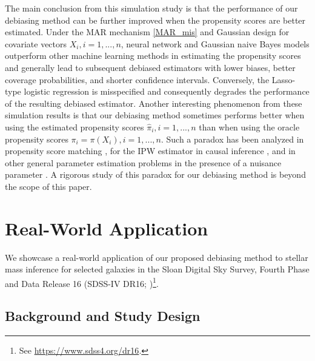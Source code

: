 \documentclass[ejsv2,noshowframe]{imsart}
\theoremstyle{plain}
\theoremstyle{definition}
\theoremstyle{remark}
\renewcommand{\hat}{\widehat}
\begin{document}
The main conclusion from this simulation study is that the performance of our debiasing method can be further improved when the propensity scores are better estimated. Under the MAR mechanism \eqref{MAR_mis} and Gaussian design for covariate vectors $X_i,i=1,...,n$, neural network and Gaussian naive Bayes models outperform other machine learning methods in estimating the propensity scores and generally lead to subsequent debiased estimators with lower biases, better coverage probabilities, and shorter confidence intervals. Conversely, the Lasso-type logistic regression is misspecified and consequently degrades the performance of the resulting debiased estimator. Another interesting phenomenon from these simulation results is that our debiasing method sometimes performs better when using the estimated propensity scores $\hat{\pi}_i,i=1,...,n$ than when using the oracle propensity scores $\pi_i=\pi(X_i),i=1,...,n$. Such a paradox has been analyzed in propensity score matching \citep{rosenbaum1987model}, for the IPW estimator in causal inference \citep{robins1992estimating,su2023estimated}, and in other general parameter estimation problems in the presence of a nuisance parameter \citep{henmi2004paradox,hitomi2008puzzling,lok2021estimating}. A rigorous study of this paradox for our debiasing method is beyond the scope of this paper. 


\section{Real-World Application}
\label{sec:real_application}

We showcase a real-world application of our proposed debiasing method to stellar mass inference for selected galaxies in the Sloan Digital Sky Survey, Fourth Phase and Data Release 16 (SDSS-IV DR16; \citealt{ahumada202016th})\footnote{See \url{https://www.sdss4.org/dr16}.}. 

\subsection{Background and Study Design}
\label{subsec:real_app_design}
\end{document}
